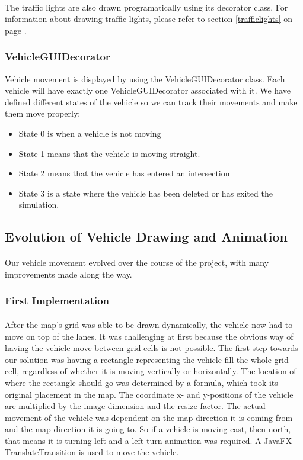 \documentclass[a4paper,11pt,titlepage]{article}
\begin{document}
\paragraph{}
The traffic lights are also drawn programatically using its decorator class. For information about drawing traffic lights, please refer to section \ref{trafficlights} on page \pageref{trafficlights}.
\subsubsection{VehicleGUIDecorator}
Vehicle movement is displayed by using the VehicleGUIDecorator class. 
Each vehicle will have exactly one VehicleGUIDecorator associated with it. We have defined different states of the vehicle so we can track their movements and make them move properly:
\begin{itemize}\itemsep1pt \parskip0pt 
\item State 0 is when a vehicle is not moving
\item State 1 means that the vehicle is moving straight.
\item State 2 means that the vehicle has entered an intersection
\item State 3 is a state where the vehicle has been deleted or has exited the simulation.
\end{itemize} 

\subsection{Evolution of Vehicle Drawing and Animation}
\paragraph{}
Our vehicle movement evolved over the course of the project, with many improvements made along the way. 
\subsubsection{First Implementation}
\paragraph{}
After the map's grid was able to be drawn dynamically, the vehicle now had to move on top of the lanes. It was challenging at first because the obvious way of having the vehicle move between grid cells is not possible. The first step towards our solution was having a rectangle representing the vehicle fill the whole grid cell, regardless of whether it is moving vertically or horizontally. The location of where the rectangle should go was determined by a formula, which took its original placement in the map. The coordinate x- and y-positions of the vehicle are multiplied by the image dimension and the resize factor. The actual movement of the vehicle was dependent on the map direction it is coming from and the map direction it is going to. So if a vehicle is moving east, then north, that means it is turning left and a left turn animation was required. A JavaFX TranslateTransition is used to move the vehicle.
\end{document}
